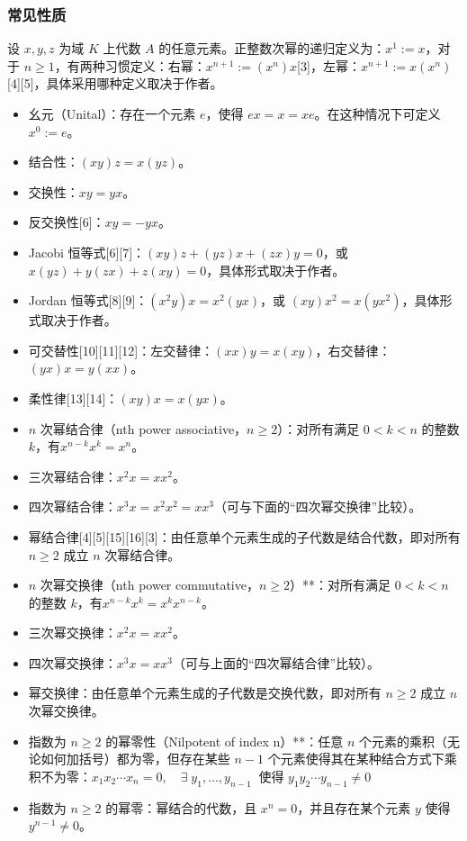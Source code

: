 \subsubsection{常见性质}
设 $x, y, z$ 为域 $K$ 上代数 $A$ 的任意元素。正整数次幂的递归定义为：$x^1 := x$，对于 $n \geq 1$，有两种习惯定义：右幂：$x^{n+1} := (x^n)x$[3]，左幂：$x^{n+1} := x(x^n)$[4][5]，具体采用哪种定义取决于作者。
\begin{itemize}
\item 幺元（Unital）：存在一个元素 $e$，使得 $ex = x = xe$。在这种情况下可定义 $x^0 := e$。
\item 结合性：$(xy)z = x(yz)$。
\item 交换性：$xy = yx$。
\item 反交换性[6]：$xy = -yx$。
\item Jacobi 恒等式[6][7]：$(xy)z + (yz)x + (zx)y = 0$，或 $x(yz) + y(zx) + z(xy) = 0$，具体形式取决于作者。
\item Jordan 恒等式[8][9]：$(x^2y)x = x^2(yx)$，或 $(xy)x^2 = x(yx^2)$，具体形式取决于作者。
\item 可交替性[10][11][12]：左交替律：$(xx)y = x(xy)$，右交替律：$(yx)x = y(xx)$。
\item 柔性律[13][14]：$(xy)x = x(yx)$。
\item $n$ 次幂结合律（nth power associative，$n \geq 2$）：对所有满足 $0 < k < n$ 的整数 $k$，有$x^{n-k}x^k = x^n$。
\item 三次幂结合律：$x^2x = xx^2$。
\item 四次幂结合律：$x^3x = x^2x^2 = xx^3$（可与下面的“四次幂交换律”比较）。
\item 幂结合律[4][5][15][16][3]：由任意单个元素生成的子代数是结合代数，即对所有 $n \geq 2$ 成立 $n$ 次幂结合律。
\item $n$ 次幂交换律（nth power commutative，$n \geq 2$）**：对所有满足 $0 < k < n$ 的整数 $k$，有$x^{n-k}x^k = x^kx^{n-k}$。
\item 三次幂交换律：$x^2x = xx^2$。
\item 四次幂交换律：$x^3x = xx^3$（可与上面的“四次幂结合律”比较）。
\item 幂交换律：由任意单个元素生成的子代数是交换代数，即对所有 $n \geq 2$ 成立 $n$ 次幂交换律。
\item 指数为 $n \geq 2$ 的幂零性（Nilpotent of index n）**：任意 $n$ 个元素的乘积（无论如何加括号）都为零，但存在某些 $n-1$ 个元素使得其在某种结合方式下乘积不为零：$x_1x_2\cdots x_n = 0, \quad \exists \; y_1,\dots,y_{n-1} \;\; \text{使得 } y_1y_2\cdots y_{n-1} \neq 0$
\item 指数为 $n \geq 2$ 的幂零：幂结合的代数，且 $x^n = 0$，并且存在某个元素 $y$ 使得 $y^{n-1} \neq 0$。
\end{itemize}
